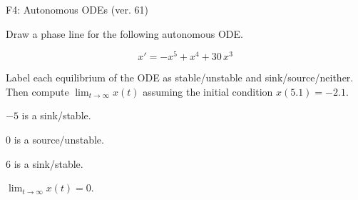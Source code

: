 \begin{exercise}
  \begin{exerciseTitle}F4: Autonomous ODEs (ver. 61)\end{exerciseTitle}
  \begin{exerciseStatement}
    

      Draw a phase line for the following 
      autonomous ODE.
    

    
\[x'= -x^{5} + x^{4} + 30 \, x^{3}\]

    

      Label each equilibrium of the ODE
      as stable/unstable and sink/source/neither.
      Then compute \(\lim_{t\to\infty}x(t)\)
      assuming the initial condition
      \(x( 5.1 )= -2.1\).
    

  \end{exerciseStatement}
  \begin{exerciseAnswer}
    

      \(-5\) is a sink/stable.
      
        \(0\) is a source/unstable.
      
      \(6\) is a sink/stable.
    

    

      \(\lim_{t\to\infty}x(t)=0\).
    

  \end{exerciseAnswer}
\end{exercise}
